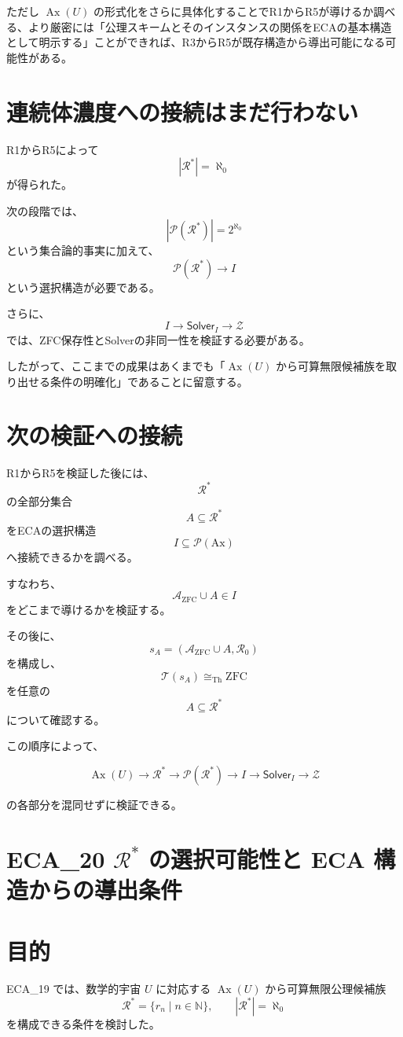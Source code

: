 \documentclass[a4paper,11pt]{article}
\newcommand{\Ax}{\mathrm{Ax}}
\newcommand{\Solver}{\mathsf{Solver}}
\newcommand{\ZFC}{\mathrm{ZFC}}
\begin{document}
ただし $\operatorname{Ax}(U)$ の形式化をさらに具体化することでR1からR5が導けるか調べる、より厳密には「公理スキームとそのインスタンスの関係をECAの基本構造として明示する」ことができれば、R3からR5が既存構造から導出可能になる可能性がある。

\section{連続体濃度への接続はまだ行わない}

R1からR5によって
\[
|\mathcal{R}^*|=\aleph_0
\]
が得られた。

次の段階では、
\[
|\mathcal P(\mathcal{R}^*)|
=
2^{\aleph_0}
\]
という集合論的事実に加えて、
\[
\mathcal P(\mathcal{R}^*)\to I
\]
という選択構造が必要である。

さらに、
\[
I\to\Solver_I\to\mathcal Z
\]
では、ZFC保存性とSolverの非同一性を検証する必要がある。

したがって、ここまでの成果はあくまでも「$\operatorname{Ax}(U)$ から可算無限候補族を取り出せる条件の明確化」であることに留意する。

\section{次の検証への接続}

R1からR5を検証した後には、
\[
\mathcal{R}^*
\]
の全部分集合
\[
A\subseteq\mathcal{R}^*
\]
をECAの選択構造
\[
I\subseteq\mathcal P(\Ax)
\]
へ接続できるかを調べる。

すなわち、
\[
\mathcal{A}_{\mathrm{ZFC}}\cup A\in I
\]
をどこまで導けるかを検証する。

その後に、
\[
s_A
=
(\mathcal{A}_{\mathrm{ZFC}}\cup A,\mathcal{R}_0)
\]
を構成し、
\[
\mathcal{T}(s_A)\cong_{\mathrm{Th}}\ZFC
\]
を任意の
\[
A\subseteq\mathcal{R}^*
\]
について確認する。

この順序によって、

\[
\boxed{
\operatorname{Ax}(U)
\to
\mathcal{R}^*
\to
\mathcal P(\mathcal{R}^*)
\to
I
\to
\Solver_I
\to
\mathcal Z
}
\]

の各部分を混同せずに検証できる。





\section{ECA_20 $\mathcal{R}^*$ の選択可能性と ECA 構造からの導出条件}


\section{目的}
ECA_19 では、数学的宇宙 $U$ に対応する
$\operatorname{Ax}(U)$ から可算無限公理候補族
\[
\mathcal{R}^*=\{r_n\mid n\in\mathbb{N}\},
\qquad |\mathcal{R}^*|=\aleph_0
\]
を構成できる条件を検討した。
\end{document}

